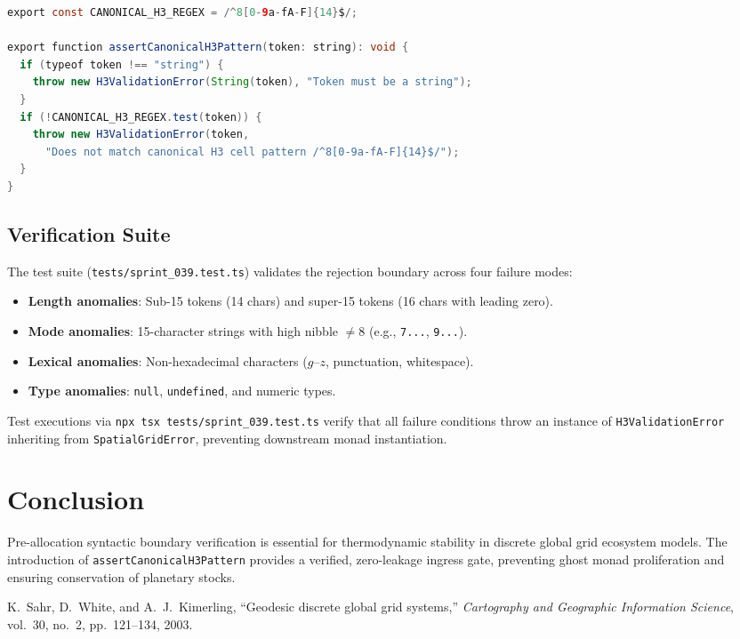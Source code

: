 \documentclass[11pt,a4paper]{article}
\begin{document}
\begin{lstlisting}[language=Java]
export const CANONICAL_H3_REGEX = /^8[0-9a-fA-F]{14}$/;

export function assertCanonicalH3Pattern(token: string): void {
  if (typeof token !== "string") {
    throw new H3ValidationError(String(token), "Token must be a string");
  }
  if (!CANONICAL_H3_REGEX.test(token)) {
    throw new H3ValidationError(token, 
      "Does not match canonical H3 cell pattern /^8[0-9a-fA-F]{14}$/");
  }
}
\end{lstlisting}

\subsection{Verification Suite}
The test suite (\texttt{tests/sprint\_039.test.ts}) validates the rejection boundary across four failure modes:
\begin{itemize}
    \item \textbf{Length anomalies}: Sub-15 tokens (14 chars) and super-15 tokens (16 chars with leading zero).
    \item \textbf{Mode anomalies}: 15-character strings with high nibble $\ne 8$ (e.g., \texttt{7...}, \texttt{9...}).
    \item \textbf{Lexical anomalies}: Non-hexadecimal characters ($g$--$z$, punctuation, whitespace).
    \item \textbf{Type anomalies}: \texttt{null}, \texttt{undefined}, and numeric types.
\end{itemize}

Test executions via \texttt{npx tsx tests/sprint\_039.test.ts} verify that all failure conditions throw an instance of \texttt{H3ValidationError} inheriting from \texttt{SpatialGridError}, preventing downstream monad instantiation.

\section{Conclusion}

Pre-allocation syntactic boundary verification is essential for thermodynamic stability in discrete global grid ecosystem models. The introduction of \texttt{assertCanonicalH3Pattern} provides a verified, zero-leakage ingress gate, preventing ghost monad proliferation and ensuring conservation of planetary stocks.

\begin{thebibliography}{9}
K.~Sahr, D.~White, and A.~J.~Kimerling,
``Geodesic discrete global grid systems,''
\emph{Cartography and Geographic Information Science}, vol.~30, no.~2, pp.~121--134, 2003.
\end{thebibliography}
\end{document}
